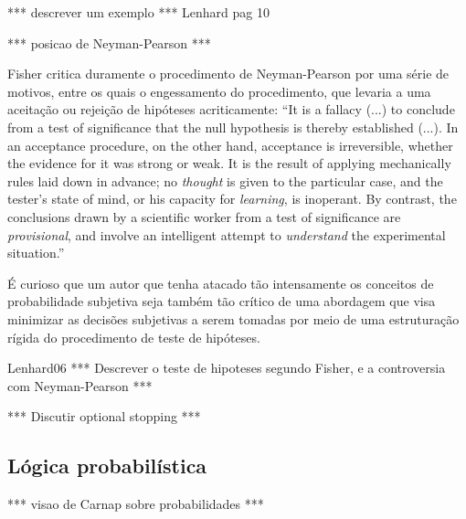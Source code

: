 \documentclass[12pt,a4paper]{article}
\begin{document}
*** descrever um exemplo ***
Lenhard pag 10

*** posicao de Neyman-Pearson ***

Fisher critica duramente o procedimento de Neyman-Pearson por uma série de motivos, entre os quais o engessamento do procedimento,
que levaria a uma aceitação ou rejeição de hipóteses acriticamente:
``It is a fallacy (...) to conclude from a test of significance that the null hypothesis is thereby established (...).
In an acceptance procedure, on the other hand, acceptance is irreversible, whether the evidence for it was strong or weak.
It is the result of applying mechanically rules laid down in advance; no {\em thought} is given to the particular case,
and the tester's state of mind, or his capacity for {\em learning}, is inoperant.
By contrast, the conclusions drawn by a scientific worker from a test of significance are {\em provisional}, and involve
an intelligent attempt to {\em understand} the experimental situation.''\cite{Fisher1955}

É curioso que um autor que tenha atacado tão intensamente os conceitos de probabilidade subjetiva seja também tão crítico de 
uma abordagem que visa minimizar as decisões subjetivas a serem tomadas por meio de uma estruturação rígida do procedimento
de teste de hipóteses. 

Lenhard06
*** Descrever o teste de hipoteses segundo Fisher, e a controversia com Neyman-Pearson ***

*** Discutir optional stopping ***
\subsection{Lógica probabilística}

*** visao de Carnap sobre probabilidades ***
\end{document}
